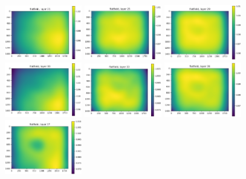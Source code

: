 \documentclass[letterpaper,11pt]{article}
\begin{document}
\begin{figure}[!ht]
\centering
\includegraphics[width=0.3\textwidth]{images/methods/flatfield_layers_polaris/flatfield_layer_21}
\includegraphics[width=0.3\textwidth]{images/methods/flatfield_layers_polaris/flatfield_layer_25}
\includegraphics[width=0.3\textwidth]{images/methods/flatfield_layers_polaris/flatfield_layer_29}
\includegraphics[width=0.3\textwidth]{images/methods/flatfield_layers_polaris/flatfield_layer_30}
\includegraphics[width=0.3\textwidth]{images/methods/flatfield_layers_polaris/flatfield_layer_33}
\includegraphics[width=0.3\textwidth]{images/methods/flatfield_layers_polaris/flatfield_layer_36}
\includegraphics[width=0.3\textwidth]{images/methods/flatfield_layers_polaris/flatfield_layer_37}

\end{figure}
\end{document}
